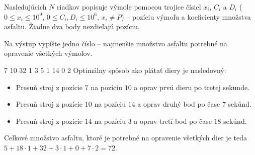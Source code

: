 Nasledujúcich $N$ riadkov popisuje výmole pomocou trojice čísiel $x_i$, $C_i$ a $D_i$ ($0 \leq x_i
\leq 10^9$, $0 \leq C_i,D_i \leq 10^6$, $x_i \neq P$) -- pozíciu výmoľu a koeficienty množstva
asfaltu. Žiadne dva body nezdieľajú pozíciu.


Na výstup vypíšte jedno číslo -- najmenšie množstvo asfaltu potrebné na opravenie všetkých výmoľov.



 7
10 32 1
3 5 1
14 0 2
\sampleCOMMENT
Optimálny spôsob ako plátať diery je nasledovný:
\begin{itemize}
	\item Presuň stroj z pozície $7$ na pozíciu $10$ a oprav prvú dieru po tretej sekunde.
	\item Presuň stroj z pozície $10$ na pozíciu $14$ a oprav druhý bod po čase $7$ sekúnd.
	\item Presuň stroj z pozície $14$ na pozíciu $3$ a oprav tretí bod po čase $18$ sekúnd.
\end{itemize}
Celkové množstvo asfaltu, ktoré je potrebné na opravenie všetkých dier je teda $5 + 18 \cdot 1 + 32 + 3 \cdot 1 + 0 + 7 \cdot 2 = 72$.
\sampleEND



